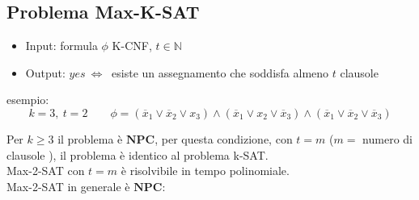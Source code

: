 \documentclass[a4paper]{article}
\theoremstyle{definition}
\newcommand{\N}{\mathbb{N}}
\newcommand{\npc}{\mathbf{NPC}}
\begin{document}
		
		\subsection{Problema Max-K-SAT}
			\begin{itemize}
				\item Input: formula $ \phi $ K-CNF, $ t \in \N $
				\item Output: $ yes\ \Leftrightarrow\  $ esiste un assegnamento che soddisfa almeno $ t $ clausole
			\end{itemize}
			
			esempio:
			\[
				k = 3,\ t = 2\qquad \phi = (\overline{x}_1\vee\overline{x}_2\vee x_3)\wedge (\overline{x}_1\vee x_2\vee \overline{x}_3)\wedge(\overline{x}_1\vee \overline{x}_2\vee \overline{x}_3)
 			\]
 			
 			Per $ k \geq 3 $ il problema è $ \npc $, per questa condizione, con $ t = m $ ($ m = $ numero di clausole ), il problema è identico al problema k-SAT.\\
			Max-2-SAT con $ t = m $ è risolvibile in tempo polinomiale.\\
			Max-2-SAT in generale è $ \npc $:
			
\end{document}
